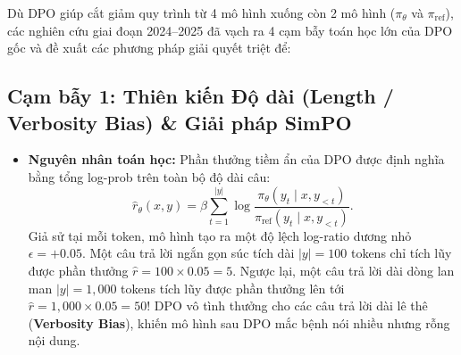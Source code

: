 Dù DPO giúp cắt giảm quy trình từ 4 mô hình xuống còn 2 mô hình ($\pi_\theta$ và $\pi_{\text{ref}}$), các nghiên cứu giai đoạn 2024--2025 đã vạch ra 4 cạm bẫy toán học lớn của DPO gốc và đề xuất các phương pháp giải quyết triệt để:

\subsection{Cạm bẫy 1: Thiên kiến Độ dài (Length / Verbosity Bias) \& Giải pháp SimPO \citep{park2024disentangling, meng2024simpo}}
\begin{itemize}[leftmargin=1.2cm]
    \item \textbf{Nguyên nhân toán học:} Phần thưởng tiềm ẩn của DPO được định nghĩa bằng tổng log-prob trên toàn bộ độ dài câu:
    \begin{equation}
        \hat{r}_\theta(x, y) = \beta \sum_{t=1}^{|y|} \log \frac{\pi_\theta(y_t \mid x, y_{<t})}{\pi_{\text{ref}}(y_t \mid x, y_{<t})}.
    \end{equation}
    Giả sử tại mỗi token, mô hình tạo ra một độ lệch log-ratio dương nhỏ $\epsilon = +0.05$. Một câu trả lời ngắn gọn súc tích dài $|y| = 100$ tokens chỉ tích lũy được phần thưởng $\hat{r} = 100 \times 0.05 = 5$. Ngược lại, một câu trả lời dài dòng lan man $|y| = 1,000$ tokens tích lũy được phần thưởng lên tới $\hat{r} = 1,000 \times 0.05 = 50$!
    DPO vô tình thưởng cho các câu trả lời dài lê thê (\textbf{Verbosity Bias}), khiến mô hình sau DPO mắc bệnh nói nhiều nhưng rỗng nội dung.
\end{itemize}

